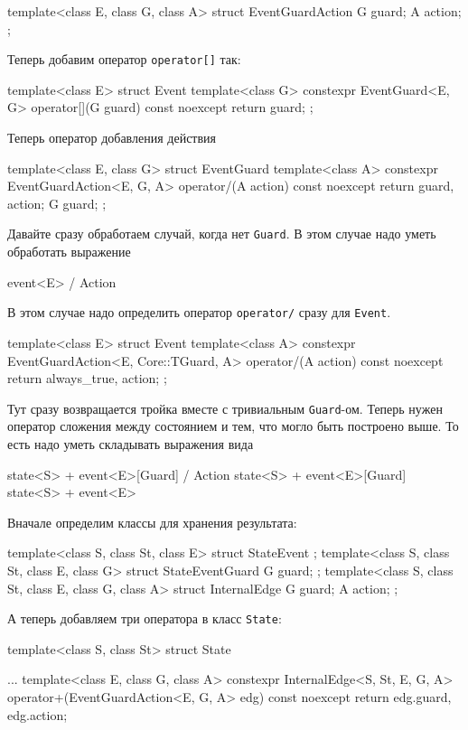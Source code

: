 \documentclass{article}
\begin{document}
{\begin{cppcode}[\nonumbers]
template<class E, class G, class A>
struct EventGuardAction {
  G guard;
  A action;
};
\end{cppcode}
Теперь добавим оператор \verb"operator[]" так:
\begin{cppcode}[\nonumbers]
template<class E>
struct Event {
  template<class G>
  constexpr EventGuard<E, G> operator[](G guard) const noexcept {
    return {guard};
  }
};
\end{cppcode}
Теперь оператор добавления действия
\begin{cppcode}[\nonumbers]
template<class E, class G>
struct EventGuard {
  template<class A>
  constexpr EventGuardAction<E, G, A> operator/(A action) const noexcept {
      return {guard, action};
  }
  G guard;
};
\end{cppcode}
Давайте сразу обработаем случай, когда нет \verb"Guard".
В этом случае надо уметь обработать выражение
\begin{cppcode}[\nonumbers]
event<E> / Action
\end{cppcode}
В этом случае надо определить оператор \verb"operator/" сразу для \verb"Event".
\begin{cppcode}[\nonumbers]

template<class E>
struct Event {
  template<class A>
  constexpr EventGuardAction<E, Core::TGuard, A>
  operator/(A action) const noexcept {
    return {always_true, action};
  }
};
\end{cppcode}
Тут сразу возвращается тройка вместе с тривиальным \verb"Guard"-ом.
Теперь нужен оператор сложения между состоянием и тем, что могло быть построено выше.
То есть надо уметь складывать выражения вида
\begin{cppcode}[\nonumbers]
state<S> + event<E>[Guard] / Action
state<S> + event<E>[Guard]
state<S> + event<E>
\end{cppcode}
Вначале определим классы для хранения результата:
\begin{cppcode}[\nonumbers]
template<class S, class St, class E>
struct StateEvent {
};
template<class S, class St, class E, class G>
struct StateEventGuard {
  G guard;
};
template<class S, class St, class E, class G, class A>
struct InternalEdge {
  G guard;
  A action;
};
\end{cppcode}
А теперь добавляем три оператора в класс \verb"State":
\begin{cppcode}[\nonumbers]
template<class S, class St>
struct State {
  ...
  template<class E, class G, class A>
  constexpr InternalEdge<S, St, E, G, A>
  operator+(EventGuardAction<E, G, A> edg) const noexcept {
    return {edg.guard, edg.action};
  }

}
\end{cppcode}}
\end{document}
